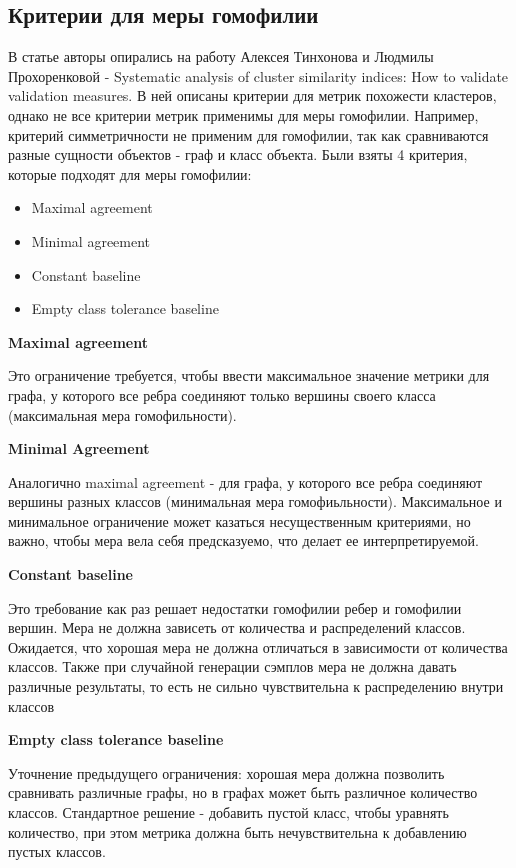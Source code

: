 \documentclass[a4paper,14pt]{article}
\begin{document}
	\subsection{Критерии для меры гомофилии}
	
	В статье авторы опирались на работу Алексея Тинхонова и Людмилы Прохоренковой - Systematic analysis of cluster similarity indices: How to validate validation measures.
	В ней описаны критерии для метрик похожести кластеров, однако не все критерии метрик применимы для меры гомофилии.
	Например, критерий симметричности не применим для гомофилии, так как сравниваются разные сущности объектов - граф и класс объекта.
	Были взяты 4 критерия, которые подходят для меры гомофилии:
	
	\begin{itemize}
		\item Maximal agreement
		
		\item Minimal agreement
		
		\item Constant baseline
		
		\item Empty class tolerance baseline
	\end{itemize}
	
	\textbf{Maximal agreement}
	
	Это ограничение требуется, чтобы ввести максимальное значение метрики для графа, у которого все ребра соединяют только вершины своего класса (максимальная мера гомофильности).
	
	\textbf{Minimal Agreement} 
	
	Аналогично maximal agreement - для графа, у которого все ребра соединяют вершины разных классов (минимальная мера гомофиьльности).
	Максимальное и минимальное ограничение может казаться несущественным критериями, но важно, чтобы мера вела себя предсказуемо, что делает ее интерпретируемой.
	
	\textbf{Constant baseline}
	
	Это требование как раз решает недостатки гомофилии ребер и гомофилии вершин.
	Мера не должна зависеть от количества и распределений классов.
	Ожидается, что хорошая мера не должна отличаться в зависимости от количества классов.
	Также при случайной генерации сэмплов мера не должна давать различные результаты, то есть не сильно чувствительна к распределению внутри классов
	
	\textbf{Empty class tolerance baseline}
	
	Уточнение предыдущего ограничения: хорошая мера должна позволить сравнивать различные графы, но в графах может быть различное количество классов. Стандартное решение - добавить пустой класс, чтобы уравнять количество, при этом метрика должна быть нечувствительна к добавлению пустых классов.
	
\end{document}
